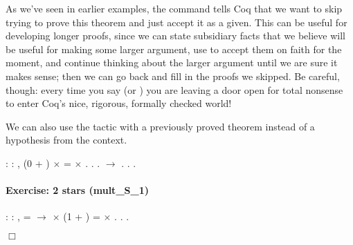 \documentclass[12pt]{report}
\begin{document}
 As we've seen in earlier examples, the  command
    tells Coq that we want to skip trying to prove this theorem and
    just accept it as a given.  This can be useful for developing
    longer proofs, since we can state subsidiary facts that we believe
    will be useful for making some larger argument, use  to
    accept them on faith for the moment, and continue thinking about
    the larger argument until we are sure it makes sense; then we can
    go back and fill in the proofs we skipped.  Be careful, though:
    every time you say  (or ) you are leaving a door
    open for total nonsense to enter Coq's nice, rigorous, formally
    checked world! 

 We can also use the  tactic with a previously proved
    theorem instead of a hypothesis from the context. \begin{coqdoccode}
\coqdocemptyline
\coqdocnoindent
{}  : \coqdockw{\ensuremath{\forall}}   : ,\coqdoceol
\coqdocindent{1.00em}
(0 + ) \ensuremath{\times}  =  \ensuremath{\times} .\coqdoceol
\coqdocnoindent
{}.\coqdoceol
\coqdocindent{1.00em}
  .\coqdoceol
\coqdocindent{1.00em}
 \ensuremath{\rightarrow} .\coqdoceol
\coqdocindent{1.00em}
. .\coqdoceol
\coqdocemptyline
\end{coqdoccode}
\paragraph{Exercise: 2 stars (mult\_S\_1)}

\begin{coqdoccode}
\coqdocnoindent
{}  : \coqdockw{\ensuremath{\forall}}   : ,\coqdoceol
\coqdocindent{1.00em}
 =   \ensuremath{\rightarrow} \coqdoceol
\coqdocindent{1.00em}
 \ensuremath{\times} (1 + ) =  \ensuremath{\times} .\coqdoceol
\coqdocnoindent
{}.\coqdoceol
 .\coqdoceol
\end{coqdoccode}
\ensuremath{\Box} \begin{coqdoccode}
\coqdocemptyline
\end{coqdoccode}
\end{document}
